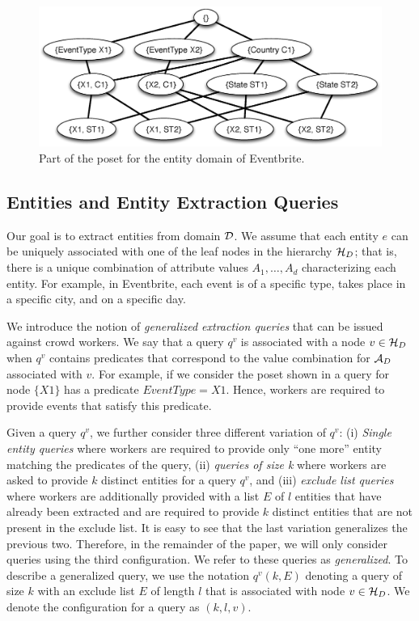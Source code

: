 \begin{figure}[h]
	\begin{center}
	\includegraphics[clip,scale=0.28]{figs/eventsExLattice.eps}
	\caption{Part of the poset for the entity domain of Eventbrite.}
	\label{fig:eventslattice}
	\vspace{-15pt}
	\end{center}
\end{figure}

\subsection{Entities and Entity Extraction Queries}
\label{sec:queries}

 Our goal is to extract entities from domain $\mathcal{D}$. We assume that each entity $e$ can be uniquely associated with one of the leaf nodes in the hierarchy $\mathcal{H}_D$; that is, there is a unique combination of attribute values $A_1, \ldots, A_d$ characterizing each entity. For example, in Eventbrite, each event is of a specific type, takes place in a specific city, and on a specific day.

 We introduce the notion of {\em generalized extraction queries} that can be issued against crowd workers. We say that a query $q^v$ is associated with a node $v \in \mathcal{H}_D$ when $q^v$ contains predicates that correspond to the value combination for $\mathcal{A}_D$ associated with $v$. For example, if we consider the poset shown in  a query for node $\{X1\}$ has a predicate $EventType = X1$. Hence, workers are required to provide events that satisfy this predicate.

Given a query $q^v$, we further consider three different variation of $q^v$: (i) {\em Single entity queries} where workers are required to provide only ``one more'' entity matching the predicates of the query, (ii) {\em queries of size k} where workers are asked to provide $k$ distinct entities for a query $q^v$, and (iii) {\em exclude list queries} where workers are additionally provided with a list $E$ of $l$ entities that have already been extracted and are required to provide $k$ distinct entities that are not present in the exclude list. It is easy to see that the last variation generalizes the previous two. Therefore, in the remainder of the paper, we will only consider queries using the third configuration. We refer to these queries as {\em generalized}. To describe a generalized query, we use the notation $q^v(k,E)$ denoting a query of size $k$ with an exclude list $E$ of length $l$ that is associated with node $v \in \mathcal{H}_D$. We denote the configuration for a query as $(k,l,v)$. 

